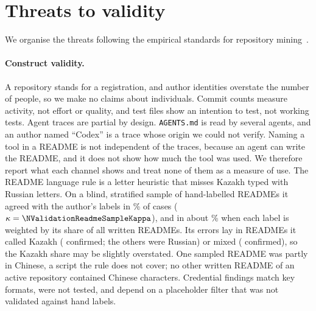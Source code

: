 \documentclass{article}
\begin{document}
\section{Threats to validity}\label{sec:threats}

We organise the threats following the empirical standards for repository mining~\cite{ralph2020standards}.

\paragraph{Construct validity.} A repository stands for a registration, and author identities overstate the number of people, so we make no claims about individuals. Commit counts measure activity, not effort or quality, and test files show an intention to test, not working tests. Agent traces are partial by design. \texttt{AGENTS.md} is read by several agents, and an author named ``Codex'' is a trace whose origin we could not verify. Naming a tool in a README is not independent of the traces, because an agent can write the README, and it does not show how much the tool was used. We therefore report what each channel shows and treat none of them as a measure of use. The README language rule is a letter heuristic that misses Kazakh typed with Russian letters. On a blind, stratified sample of \NValidationReadmeSampleLabelled{} hand-labelled READMEs it agreed with the author's labels in \NValidationReadmeSampleAgreePct\% of cases ($\kappa = \NValidationReadmeSampleKappa$), and in about \NValidationReadmeSampleWeightedAcc\% when each label is weighted by its share of all written READMEs. Its errors lay in READMEs it called Kazakh (\NValidationReadmeSampleAgreeKazakh{} confirmed; the others were Russian) or mixed (\NValidationReadmeSampleAgreeMixed{} confirmed), so the Kazakh share may be slightly overstated. One sampled README was partly in Chinese, a script the rule does not cover; no other written README of an active repository contained Chinese characters. Credential findings match key formats, were not tested, and depend on a placeholder filter that was not validated against hand labels.
\end{document}

